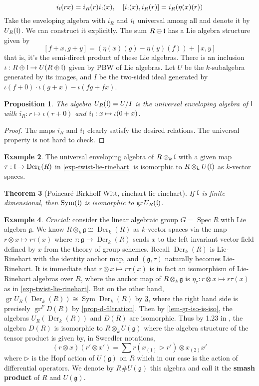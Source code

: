 \documentclass[11pt, a4paper]{article}
\newtheorem{theorem}{Theorem}[subsection]
\newtheorem{proposition}[theorem]{Proposition}
\theoremstyle{definition}
\newtheorem{example}[theorem]{Example}
\newcommand{\gr}{\operatorname{gr}}
\newcommand{\Spec}[0]{\operatorname{Spec}}
\newcommand{\Sym}[0]{\operatorname{Sym}}
\newcommand{\g}{\mathfrak g}
\newcommand{\Der}{\operatorname{Der}}
\begin{document}
    \[i_\mathfrak l(rx)=i_R(r)i_\mathfrak l(x),\quad [i_\mathfrak l(x), i_R(r)]=i_R(\eta(x)(r))\]
    Take the enveloping algebra with $i_R$ and $i_\mathfrak l$ universal among all and denote it by $U_R(\mathfrak l)$. We can construct it explicitly. The sum $R\oplus \mathfrak l$ has a Lie algebra structure given by
    \[[f+x, g+y]=(\eta(x)(g)-\eta(y)(f))+[x, y]\]
    that is, it's the semi-direct product of these Lie algebras. There is an inclusion $\iota:R\oplus\mathfrak l\to U(R\oplus\mathfrak l)$ given by PBW of Lie algebras. Let $U$ be the $k$-subalgebra generated by its images, and $I$ be the two-sided ideal generated by $\iota(f+0)\cdot \iota(g+x)-\iota(fg+fx)$.
    \begin{proposition}
        The algebra $U_R(\mathfrak l)=U/I$ is the universal enveloping algebra of $\mathfrak l$ with $i_R:r\mapsto \iota(r+0)$ and $i_\mathfrak l:x\mapsto \iota(0+x)$.
    \end{proposition}
    \begin{proof}
        The maps $i_R$ and $i_\mathfrak l$ clearly satisfy the desired relations. The universal property is not hard to check.
    \end{proof}
    \begin{example}\label{exp-uea-lie-rinehart}
        The universal enveloping algebra of $R\otimes_k \mathfrak l$ with a given map $\tau:\l\to \Der_k(R)$ in \cref{exp-twist-lie-rinehart} is isomorphic to $R\otimes_k U(\mathfrak l)$ as $k$-vector spaces.
    \end{example}
    \begin{theorem}[Poincaré-Birkhoff-Witt, {rinehart-lie-rinehart}]\label{thm-pbw-lr-algebra}
        If $\mathfrak l$ is finite dimensional, then $\Sym(\l)$ is isomorphic to $\gr U_R(\l)$.
    \end{theorem}
    \begin{example}\label{exp-smash-prod}
        \textit{Crucial:} consider the linear algebraic group $G=\Spec R$ with Lie algebra $\g$. We know $R\otimes_k\g\cong \Der_k(R)$ as $k$-vector spaces via the map $r\otimes x\mapsto r\tau(x)$ where $\tau:\g\to \Der_k(R)$ sends $x$ to the left invariant vector field defined by $x$ from the theory of group schemes. Recall $\Der_k(R)$ is Lie-Rinehart with the identity anchor map, and $(\g, \tau)$ naturally becomes Lie-Rinehart. It is immediate that $r\otimes x\mapsto r\tau(x)$ is in fact an isomorphism of Lie-Rinehart algebras over $R$, where the anchor map of $R\otimes_k\g$ is $\eta_\tau:r\otimes x\mapsto r\tau(x)$ as in \cref{exp-twist-lie-rinehart}. But on the other hand, $\gr U_R(\Der_k(R))\cong\Sym\Der_k(R)$ by \cref{thm-pbw-lr-algebra}, where the right hand side is precisely $\gr^F D(R)$ by \cref{prop-d-filtration}. Then by \cref{lem-gr-iso-is-iso}, the algebras $U_R(\Der_k(R))$ and $D(R)$ are isomorphic. Thus by 1.23 in \cite{bekaert-lie-rinehart}, the algebra $D(R)$ is isomorphic to $R\otimes_kU(\g)$ where the algebra structure of the tensor product is given by, in Sweedler notations,
        \[(r\otimes x)(r'\otimes x')=\sum r(x_{(1)}\triangleright r')\otimes x_{(2)}x'\]
        where $\triangleright$ is the Hopf action of $U(\g)$ on $R$ which in our case is the action of differential operators. We denote by $R\# U(\g)$ this algebra and call it the \textbf{smash product} of $R$ and $U(\g)$.
    \end{example}
\end{document}
